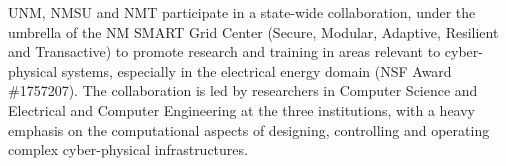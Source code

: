 UNM, NMSU and NMT participate in a state-wide collaboration, under the umbrella of the NM SMART Grid Center (Secure, Modular, Adaptive, Resilient and Transactive) to promote research and training in areas relevant to cyber-physical systems, especially in the electrical energy domain (NSF Award \#1757207). The collaboration is led by researchers in Computer Science and Electrical and Computer Engineering at the three institutions, with a heavy emphasis on the computational aspects of designing, controlling and operating complex cyber-physical infrastructures. 
